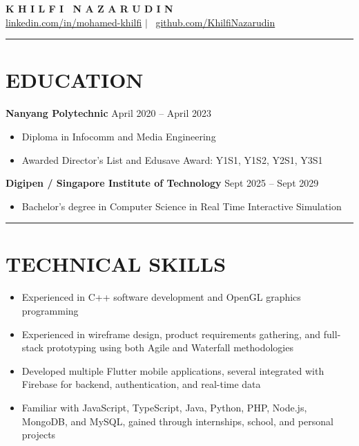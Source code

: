 \documentclass[11pt,a4paper]{article}
\newcommand{\sectionrule}{\noindent\rule{\textwidth}{0.8pt}}
\newcommand{\entrytitle}[2]{%
  \noindent\textbf{#1} \hfill #2\\
}
\begin{document}
\begin{center}
  {\fontsize{28}{30}\selectfont \textbf{K H I L F I \ N A Z A R U D I N}}\\[1pt]
  \small \href{https://www.linkedin.com/in/mohamed-khilfi}{linkedin.com/in/mohamed-khilfi} $\vert$ \ \href{https://github.com/KhilfiNazarudin}{github.com/KhilfiNazarudin}
\end{center}
\sectionrule

\section*{EDUCATION}
\vspace{2pt}
 
\entrytitle{Nanyang Polytechnic}{April 2020 -- April 2023}
\vspace{-8pt}
\begin{itemize}[itemsep=0pt, topsep=2pt, parsep=0pt]
  \item Diploma in Infocomm and Media Engineering
  \item Awarded Director's List and Edusave Award: Y1S1, Y1S2, Y2S1, Y3S1
\end{itemize}

\entrytitle{Digipen / Singapore Institute of Technology}{Sept 2025 -- Sept 2029}
\vspace{-8pt}
\begin{itemize}[itemsep=0pt, topsep=2pt, parsep=0pt]
  \item Bachelor's degree in Computer Science in Real Time Interactive Simulation
\end{itemize}
\sectionrule

\section*{TECHNICAL SKILLS}
\vspace{2pt}
\begin{itemize}
  \item Experienced in C++ software development and OpenGL graphics programming
  \item Experienced in wireframe design, product requirements gathering, and full-stack prototyping using both Agile and Waterfall methodologies
  \item Developed multiple Flutter mobile applications, several integrated with Firebase for backend, authentication, and real-time data
  \item Familiar with JavaScript, TypeScript, Java, Python, PHP, Node.js, MongoDB, and MySQL, gained through internships, school, and personal projects
\end{itemize}
\end{document}
